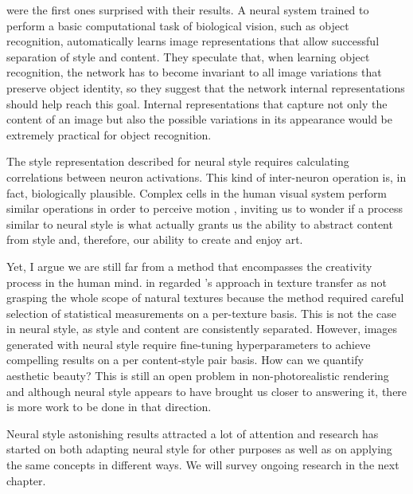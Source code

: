 \citeauthor{Gatys2015B} were the first ones surprised with their results.
A neural system trained to perform a basic computational task of biological vision, such as object recognition, automatically learns image representations that allow successful separation of style and content.
They speculate that, when learning object recognition, the network has to become invariant to all image variations that preserve object identity, so they suggest that the network internal representations should help reach this goal.
Internal representations that capture not only the content of an image but also the possible variations in its appearance would be extremely practical for object recognition.

The style representation described for neural style requires calculating correlations between neuron activations.
This kind of inter-neuron operation is, in fact, biologically plausible.
Complex cells in the human visual system perform similar operations in order to perceive motion \cite{Adelson1985}, inviting us to wonder if a process similar to neural style is what actually grants us the ability to abstract content from style and, therefore, our ability to create and enjoy art.

Yet, I argue we are still far from a method that encompasses the creativity process in the human mind.
\citeauthor{Gatys2015A} in \cite{Gatys2015A} regarded \citet{Portilla2000}'s approach in texture transfer as not grasping the whole scope of natural textures because the method required careful selection of statistical measurements on a per-texture basis.
This is not the case in neural style, as style and content are consistently separated.
However, images generated with neural style require fine-tuning hyperparameters to achieve compelling results on a per content-style pair basis.
How can we quantify aesthetic beauty? This is still an open problem in non-photorealistic rendering \cite{Kyprianidis2013} and although neural style appears to have brought us closer to answering it, there is more work to be done in that direction.

Neural style astonishing results attracted a lot of attention and research has started on both adapting neural style for other purposes as well as on applying the same concepts in different ways.
We will survey ongoing research in the next chapter.
